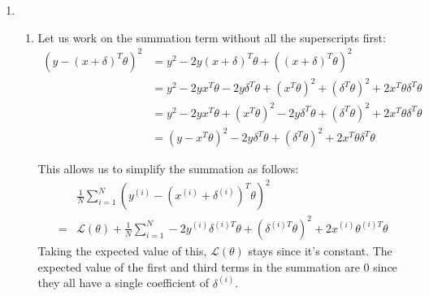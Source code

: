 \documentclass[12pt]{article}
\begin{document}
\begin{enumerate}
      \item \begin{enumerate}
                  \item Let us work on the summation term without all the superscripts first:
                        \begin{align*}
                              \left(y-(x+\delta)^T\theta\right)^2
                               & = y^2-2y(x+\delta)^T\theta+((x+\delta)^T\theta)^2                                                                  \\
                               & = y^2-2yx^T\theta-2y\delta^T\theta+\left(x^T\theta\right)^2+\left(\delta^T\theta\right)^2+2x^T\theta\delta^T\theta \\
                               & = y^2-2yx^T\theta+\left(x^T\theta\right)^2-2y\delta^T\theta+\left(\delta^T\theta\right)^2+2x^T\theta\delta^T\theta \\
                               & = \left(y-x^T\theta\right)^2-2y\delta^T\theta+\left(\delta^T\theta\right)^2+2x^T\theta\delta^T\theta
                        \end{align*}

                        This allows us to simplify the summation as follows:
                        \begin{align*}
                                  & \frac{1}{N} \sum_{i=1}^{N} \left(y^{(i)}-\left(x^{(i)}+\delta^{(i)}\right)^T\theta\right)^2                            \\
                              ={} & \mathcal{L}(\theta)+\frac{1}{N}\sum_{i=1}^{N} -2y^{(i)}\delta^{(i)T}\theta+\left(\delta^{(i)T}\theta\right)^2+2x^{(i)}\theta^{(i)T}\theta
                        \end{align*}
                        Taking the expected value of this, $\mathcal{L}(\theta)$ stays since it's constant.
                        The expected value of the first and third terms in the summation are $0$ since
                        they all have a single coefficient of $\delta^{(i)}$.


\end{enumerate}
\end{enumerate}
\end{document}
